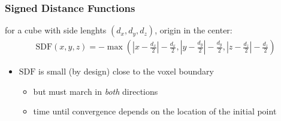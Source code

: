 \documentclass{beamer}
\begin{document}
\begin{frame}
  \frametitle{Signed Distance Functions}
  for a cube with side lenghts $(d_x, d_y, d_z)$, origin in the center:
  \begin{align*}
    \text{SDF}(x, y, z) = -\max\left(\left| x - \frac{d_x}{2} \right| - \frac{d_x}{2}, \left| y - \frac{d_y}{2} \right| - \frac{d_y}{2}, \left| z - \frac{d_z}{2} \right| - \frac{d_z}{2}\right)
  \end{align*}

  \begin{itemize}
  \item $\text{SDF}$ is small (by design) close to the voxel boundary
    \begin{itemize}
    \item but must march in \textsl{both} directions
    \item time until convergence depends on the location of the initial point
    \end{itemize}
  \end{itemize}

\end{frame}
\end{document}
